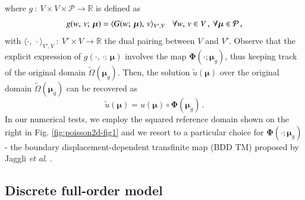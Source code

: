 \documentclass{elsarticle}
\numberwithin{equation}{section}
\theoremstyle{theorem}
\theoremstyle{definition}
\theoremstyle{remark}
\theoremstyle{proposition}
\numberwithin{figure}{section}
\newcommand{\wt}[1]{\widetilde{#1}}
\newcommand{\bg}[1]{\boldsymbol{#1}}
\begin{document}
		where $g ~ : ~ V \times V \times \mathcal{P} \rightarrow \mathbb{R}$ is defined as
		\begin{equation*}
			g(w, \, v; \, \bg{\mu}) = \langle G(w; \, \bg{\mu}), \, v \rangle_{V',V} \hspace*{0.3cm} \forall w, \, v \in V \, , ~ \forall \bg{\mu} \in \mathcal{P} \, ,
		\end{equation*}
		with $\langle \cdot, \, \cdot \rangle_{V',V} ~ : ~ V' \times V \rightarrow \mathbb{R}$ the dual pairing between $V$ and $V'$. Observe that the explicit expression of $g(\cdot, \, \cdot; \, \bg{\mu})$ involves the map $\bg{\Phi}(\cdot; \bg{\mu}_g)$, thus keeping track of the original domain $\wt{\Omega}(\bg{\mu}_g)$. Then, the solution $\wt{u}(\bg{\mu})$ over the original domain $\wt{\Omega}(\bg{\mu}_g)$ can be recovered as
		\begin{equation*}
			\wt{u}(\bg{\mu}) = u(\bg{\mu}) \circ \bg{\Phi}(\bg{\mu}_g) \, .
		\end{equation*}
		In our numerical tests, we employ the squared reference domain shown on the right in Fig. \ref{fig:poisson2d-fig1} and we resort to a particular choice for $\bg{\Phi}(\cdot; \bg{\mu}_g)$ - the boundary displacement-dependent transfinite map (BDD TM) proposed by Jaggli \emph{et al}. \cite{JIR14}.
		
		
	
	\subsection{Discrete full-order model}
	\label{section:Discrete full-order model}
	
\end{document}
